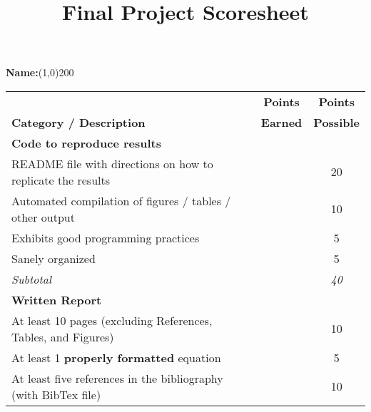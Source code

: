 \documentclass[12pt,english]{article}
\begin{document}

\title{\textbf{Final Project Scoresheet}}
\author{}
\date{}

\maketitle
\thispagestyle{empty}
\bigskip{}

\flushleft \textbf{Name:}\line(1,0){200}

\begin{center}
\begin{tabular}{l|c|c}
\hline
                                & \textbf{Points} & \textbf{Points} \\
\textbf{Category / Description} & \textbf{Earned} & \textbf{Possible} \\
\hline
\textbf{Code to reproduce results}                                                           &               &                          \\
README file with directions on how to replicate the results                                  &               & 20                       \\
Automated compilation of figures / tables / other output                                     &               & 10                       \\
Exhibits good programming practices                                                          &               & 5                        \\
Sanely organized                                                                             &               & 5                        \\
\hline
\textit{Subtotal}                                                                            &               & \textit{40}              \\
\hline
\textbf{Written Report}                                                                      &               &                          \\
At least 10 pages (excluding References, Tables, and Figures)                                &               & 10                       \\
At least 1 \textbf{properly formatted} equation                                              &               & 5                        \\
At least five references in the bibliography (with BibTex file)                              &               & 10                       \\

\end{tabular}
\end{center}
\end{document}
